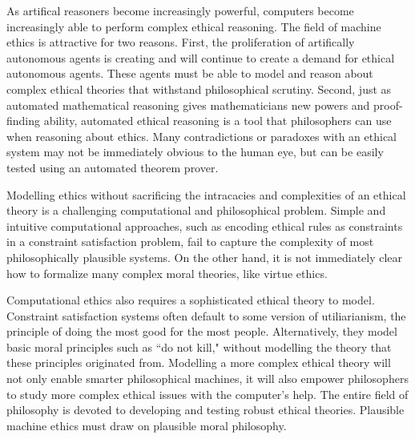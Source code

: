 %
\begin{isabellebody}%
%
%
\isadelimtheory
%
\endisadelimtheory
%
\isatagtheory
%
\endisatagtheory
{\isafoldtheory}%
%
\isadelimtheory
%
\endisadelimtheory
%
\isadelimdocument
%
\endisadelimdocument
%
\isatagdocument
%
\isamarkuptrue%
%
\endisatagdocument
{\isafolddocument}%
%
\isadelimdocument
%
\endisadelimdocument
%
\begin{isamarkuptext}%
As artifical reasoners become increasingly powerful, computers become increasingly able to 
perform complex ethical reasoning. The field of machine ethics \cite{mesurvey} is attractive for two reasons.
First, the proliferation of artifically autonomous agents is creating and will continue to create a demand for 
ethical autonomous agents. These agents must be able to model and reason about complex ethical theories 
that withstand philosophical scrutiny. Second, just as automated mathematical reasoning gives mathematicians
new powers and proof-finding ability, automated ethical reasoning is a tool that philosophers can use 
when reasoning about ethics. Many contradictions or paradoxes with an ethical system may not be 
immediately obvious to the human eye, but can be easily tested using an automated theorem prover.

Modelling ethics without sacrificing the intracacies and complexities of an ethical theory is a 
challenging computational and philosophical problem. Simple and intuitive computational approaches, 
such as encoding ethical rules as constraints in a constraint satisfaction problem, fail to capture
the complexity of most philosophically plausible systems. On the other hand, it is not immediately clear
how to formalize many complex moral theories, like virtue ethics.

Computational ethics also requires a sophisticated 
ethical theory to model. Constraint satisfaction systems often default to some version of utiliarianism, 
the principle of doing the most good for the most people. Alternatively, they model basic moral 
principles such as ``do not kill," without modelling the theory that these principles originated from.
Modelling a more complex ethical theory will not only enable smarter philosophical machines, it will
also empower philosophers to study more complex ethical issues with the computer's help. The entire
field of philosophy is devoted to developing and testing robust ethical theories. Plausible machine
ethics must draw on plausible moral philosophy.


\end{isamarkuptext}
\end{isabellebody}
